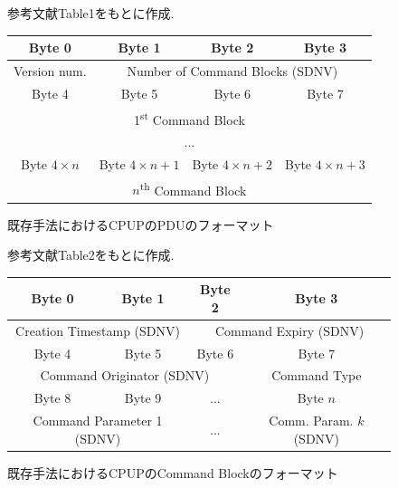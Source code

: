 \begin{figure}[htbp]
    \centering
    \caption{既存手法におけるCPUPのPDUのフォーマット}
    \label{figure:cpup_pdu_format}
    \begin{minipage}{\textwidth}
        \centering
        \fontsize{10.5pt}{12pt}\selectfont
        参考文献\cite{Bezirgiannidis2013}Table1をもとに作成. 
        \vspace{2mm} 
    \end{minipage}
    \begin{tabular}{|c|c|c|c|}
      \hline
      Byte 0 & Byte 1 & Byte 2 & Byte 3 \\
      \hline
      \multicolumn{1}{|c|}{Version num.} & \multicolumn{3}{c|}{Number of Command Blocks (SDNV)} \\
      \hline
      Byte 4 & Byte 5 & Byte 6 & Byte 7 \\
      \hline
      \multicolumn{4}{|c|}{1\textsuperscript{st} Command Block} \\
      \hline
      \multicolumn{4}{|c|}{...} \\
      \hline
      Byte $4\times n$ & Byte $4\times n+1$ & Byte $4\times n+2$ & Byte $4\times n+3$ \\
      \hline
      \multicolumn{4}{|c|}{$n$\textsuperscript{th} Command Block} \\
      \hline
    \end{tabular}
  \end{figure}
\begin{figure}[htbp]
    \centering
    \caption{既存手法におけるCPUPのCommand Blockのフォーマット}
    \label{figure:command_block_format}
    \begin{minipage}{\textwidth}
        \centering
        \fontsize{10.5pt}{12pt}\selectfont
        参考文献\cite{Bezirgiannidis2013}Table2をもとに作成. 
        \vspace{2mm} 
    \end{minipage}
    \begin{tabular}{|c|c|c|c|}
      \hline
      Byte 0 & Byte 1 & Byte 2 & Byte 3 \\
      \hline
      \multicolumn{2}{|c|}{Creation Timestamp (SDNV)} & \multicolumn{2}{c|}{Command Expiry (SDNV)} \\
      \hline
      Byte 4 & Byte 5 & Byte 6 & Byte 7 \\
      \hline
      \multicolumn{3}{|c|}{Command Originator (SDNV)} & Command Type \\
      \hline
      Byte 8 & Byte 9 & ... & Byte $n$ \\
      \hline
      \multicolumn{2}{|c|}{Command Parameter 1 (SDNV)} & \multicolumn{1}{c|}{...} & Comm. Param. $k$ (SDNV) \\
      \hline
    \end{tabular}
\end{figure}


